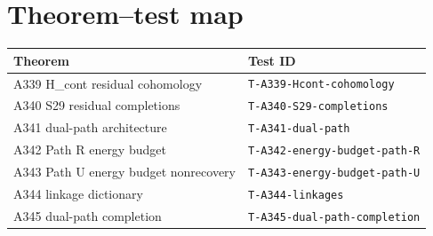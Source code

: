 \documentclass[11pt,a4paper]{article}
\begin{document}
\section{Theorem--test map}
\begin{center}\begin{tabular}{@{}p{6.5cm}p{5cm}@{}}
\toprule Theorem & Test ID \\\midrule
A339 H_cont residual cohomology & \texttt{T-A339-Hcont-cohomology} \\
A340 S29 residual completions & \texttt{T-A340-S29-completions} \\
A341 dual-path architecture & \texttt{T-A341-dual-path} \\
A342 Path R energy budget & \texttt{T-A342-energy-budget-path-R} \\
A343 Path U energy budget nonrecovery & \texttt{T-A343-energy-budget-path-U} \\
A344 linkage dictionary & \texttt{T-A344-linkages} \\
A345 dual-path completion & \texttt{T-A345-dual-path-completion} \\
\bottomrule\end{tabular}\end{center}
\end{document}
